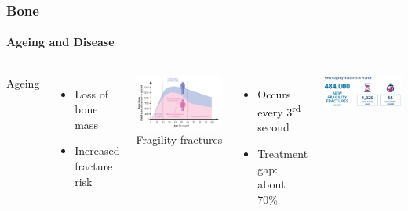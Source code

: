 \documentclass[xcolor=table,11pt]{beamer}
\begin{document}
	\begin{frame}
		\frametitle{Bone}
		\framesubtitle{Ageing and Disease}
		\begin{columns}
			Ageing
			\begin{itemize}
				\item Loss of bone mass
				\item Increased fracture risk
			\end{itemize}
			\vspace{5mm}
			\includegraphics[width=\linewidth]{Figures/BoneMass.png}
			Fragility fractures
			\begin{itemize}
				\item Occurs every 3\textsuperscript{rd} second
				\item Treatment gap: about 70\%
			\end{itemize}
			\vspace{8mm}
			\includegraphics[width=\linewidth]{Figures/France.png}
		\end{columns}
		\vfill
		\hfill{}
	\end{frame}
\end{document}
